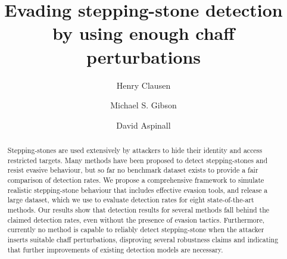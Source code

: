 \documentclass[runningheads,11pt]{llncs}\usepackage[]{graphicx}\usepackage[]{color}
\begin{document}
\title{Evading stepping-stone detection by using enough chaff perturbations}



\author{Henry Clausen \and
Michael S. Gibson \and
David Aspinall}
%
%







\maketitle     

\vspace{-0.3cm}
\begin{abstract}

Stepping-stones are used extensively by attackers to hide their identity and access restricted targets. Many methods have been proposed to detect stepping-stones and resist evasive behaviour, but so far no benchmark dataset exists to provide a fair comparison of detection rates. We propose a comprehensive framework to simulate realistic stepping-stone behaviour that includes effective evasion tools, and release a large dataset, which we use to evaluate detection rates for eight state-of-the-art methods.
Our results show that detection results for several methods fall behind the claimed detection rates, even without the presence of evasion tactics. Furthermore, currently no method is capable to reliably detect stepping-stone when the attacker inserts suitable chaff perturbations, disproving several robustness claims and indicating that further improvements of existing detection models are necessary.

\end{abstract}
\end{document}
